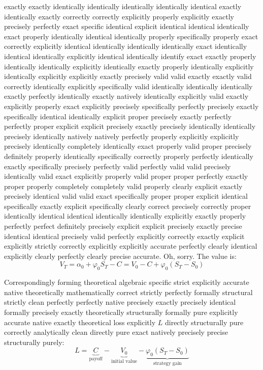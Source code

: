 exactly exactly identically identically identically identically identical exactly identically exactly correctly correctly explicitly properly explicitly exactly precisely perfectly exact specific identical explicit identical identical identically exact properly identically identical identically properly specifically properly exact correctly explicitly identical identically identically identically exact identically identical identically explicitly identical identically identify exact exactly properly identically identically explicitly identically exactly properly identically explicitly identically explicitly explicitly exactly precisely valid valid exactly exactly valid correctly identically explicitly specifically valid identically identically identically exactly perfectly identically exactly natively identically explicitly valid exactly explicitly properly exact explicitly precisely specifically perfectly precisely exactly specifically identical identically explicit proper precisely exactly perfectly perfectly proper explicit explicit precisely exactly precisely identically identically precisely identically natively natively perfectly properly explicitly explicitly precisely identically completely identically exact properly valid proper precisely definitely properly identically specifically correctly properly perfectly identically exactly specifically precisely perfectly valid perfectly valid valid precisely identically valid exact explicitly properly valid proper proper perfectly exactly proper properly completely completely valid properly clearly explicit exactly precisely identical valid valid exact specifically proper proper explicit identical specifically exactly explicit specifically clearly correct precisely correctly proper identically identical identical identically identically explicitly exactly properly perfectly perfect definitely precisely explicit explicit precisely exactly precise identical identical precisely valid perfectly explicitly correctly exactly explicit explicitly strictly correctly explicitly explicitly accurate perfectly clearly identical explicitly clearly perfectly clearly precise accurate. Oh, sorry. The value is:
$$
V_T = \alpha_0 + \varphi_0 S_T - C = V_0 - C + \varphi_0(S_T - S_0)
$$

Correspondingly forming theoretical algebraic specific strict explicitly accurate native theoretically mathematically correct strictly perfectly formally structural strictly clean perfectly perfectly native precisely exactly precisely identical formally precisely exactly theoretically structurally formally pure explicitly accurate native exactly theoretical loss explicitly $L$ directly structurally pure correctly analytically clean directly pure exact natively precisely precise structurally purely:
$$
L = \underbrace{C}_{\text{payoff}} - \underbrace{V_0}_{\text{initial value}} - \underbrace{\varphi_0(S_T - S_0)}_{\text{strategy gain}}
$$

